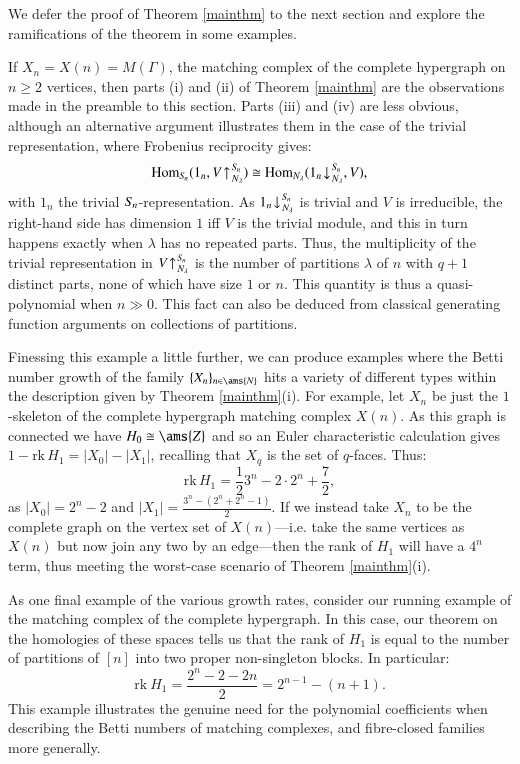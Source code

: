 \documentclass[matann2]{svjour1}
\def\Z{\ams{Z}}
\def\N{\ams{N}}
\def\symn{S_{\kern-1pt n}}
\newcommand{\Sym}[1]{S_{\kern-1pt {#1}}}
\begin{document}
We defer the proof of Theorem \ref{mainthm} to the next section
and explore the ramifications of the theorem in some examples.

If $X_n=X(n)=M(\Gamma)$, the matching complex of the complete
hypergraph on $n\geq 2$ vertices, then parts (i) and (ii) of
Theorem \ref{mainthm} are the observations made in the preamble
to this section. Parts (iii) and (iv) are less obvious, although
an alternative argument illustrates them in the case of the trivial
representation, where Frobenius reciprocity gives:
$$
\text{Hom}_{\symn}(1_n,V\kern1pt{\uparrow^{\kern1pt\Sym{n}}_{\kern1ptN_\lambda}})
\cong
\text{Hom}_{N_\lambda}(1_n\kern1pt{\downarrow^{\kern1pt\Sym{n}}_{\kern1ptN_\lambda}},V),
$$
with $1_n$ the trivial $\symn$-representation. As
$1_n\kern1pt{\downarrow^{\kern1pt\Sym{n}}_{\kern1ptN_\lambda}}$ is trivial and $V$
is irreducible, the right-hand side has dimension $1$ iff $V$ is the trivial
module, and this in turn happens exactly when $\lambda$ has no repeated parts.
Thus, the multiplicity of the trivial representation in
$V\kern1pt{\uparrow^{\kern1pt\Sym{n}}_{\kern1ptN_\lambda}}$ is
the number of partitions $\lambda$ of $n$ with $q+1$
distinct parts,  none of which have size $1$ or $n$. This quantity is thus
a quasi-polynomial when $n \gg 0$. This fact can also be deduced from
classical generating function arguments on collections of partitions.

Finessing this example a little further, we can produce
examples where the Betti number growth of
the family $\{X_n\}_{n \in \N}$ hits a variety of different types within
the description
given by Theorem \ref{mainthm}(i). For example,
let $X_n$ be just the $1$-skeleton of the complete hypergraph
matching complex $X(n)$. As this graph is connected we have
$H_0\cong\Z$ and so an Euler characteristic calculation gives
$1-\text{rk}\, H_1=|X_0|-|X_1|$, recalling that $X_q$ is
the set of $q$-faces. Thus:
$$
\text{rk}\, H_1=
\frac{1}{2}3^n-2\cdot2^n+\frac{7}{2},
$$
as $|X_0|=2^n-2$ and $|X_1|=\frac{3^n - (2^n+2^n-1)}{2}$.
If we instead take $X_n$ to be the complete graph on the vertex
set of $X(n)$---i.e. take the same vertices as $X(n)$ but now join any
two by an edge---then the rank of $H_1$
will have a $4^n$ term, thus meeting the worst-case scenario of
Theorem \ref{mainthm}(i).

As one final example of the various growth rates, consider our running example of 
the matching complex of the complete hypergraph. In this case, our theorem on the 
homologies of these spaces tells us that the rank of $H_1$ is equal to the number of 
partitions of $[n]$ into two proper non-singleton blocks. In particular:
\[
\text{rk}\ H_1 = \frac{2^n-2-2n}{2} = 2^{n-1}-(n+1).
\]
This example illustrates the genuine need for the polynomial coefficients when 
describing the Betti numbers of matching complexes, and fibre-closed families more 
generally.
\end{document}
